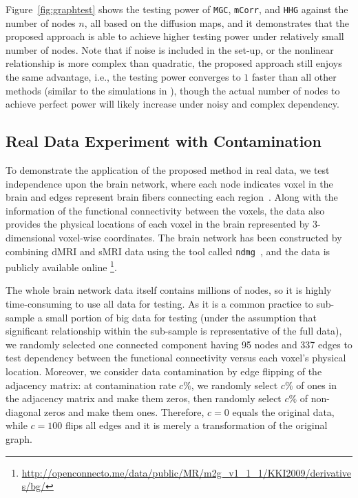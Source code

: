\documentclass[12pt]{article}
\theoremstyle{definition}
\begin{document}
	Figure~\ref{fig:graphtest} shows the testing power of \texttt{MGC}, \texttt{mCorr}, and \texttt{HHG} against the number of nodes $n$, all based on the diffusion maps, and it demonstrates that the proposed approach is able to achieve higher testing power under relatively small number of nodes. Note that if noise is included in the set-up, or the nonlinear relationship is more complex than quadratic, the proposed approach still enjoys the same advantage, i.e., the testing power converges to $1$ faster than all other methods (similar to the simulations in \cite{shen2016discovering}), though the actual number of nodes to achieve perfect power will likely increase under noisy and complex dependency.
	
	
	\subsection{Real Data Experiment with Contamination}
	\label{ssec:real}
	
	To demonstrate the application of the proposed method in real data, we test independence upon the brain network, where each node indicates voxel in the brain and edges represent brain fibers connecting each region~\citep{kiar2016ndmg}. Along with the information of the functional connectivity between the voxels, the data also provides the physical locations of each voxel in the brain represented by 3-dimensional voxel-wise coordinates. The brain network has been constructed by combining dMRI and sMRI data using the tool called \texttt{ndmg}~\citep{kiar2016science}, and the data is publicly available online \footnote{\url{http://openconnecto.me/data/public/MR/m2g_v1_1_1/KKI2009/derivatives/bg/}}.
	
	The whole brain network data itself contains millions of nodes, so it is highly time-consuming to use all data for testing. As it is a common practice to sub-sample a small portion of big data for testing (under the assumption that significant relationship within the sub-sample is representative of the full data), we randomly selected one connected component having 95 nodes and 337 edges to test dependency between the functional connectivity versus each voxel's physical location. Moreover, we consider data contamination by edge flipping of the adjacency matrix: at contamination rate $c \%$, we randomly select $c \%$ of ones in the adjacency matrix and make them zeros, then randomly select $c \%$ of non-diagonal zeros and make them ones. Therefore, $c=0$ equals the original data, while $c=100$ flips all edges and it is merely a transformation of the original graph.
	
\end{document}
